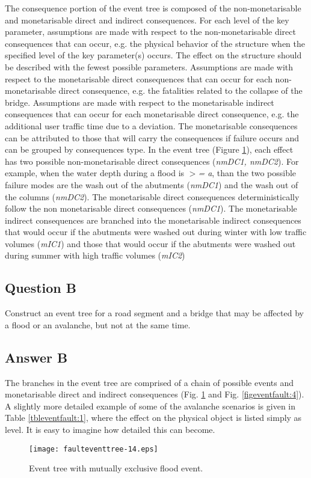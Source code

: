 The consequence portion of the event tree is composed of the non-monetarisable
and monetarisable direct and indirect consequences. For each level of the key
parameter, assumptions are made with respect to the non-monetarisable direct
consequences that can occur, e.g. the physical behavior of the structure when the
specified level of the key parameter(s) occurs. The effect on the structure
should be described with the fewest possible parameters. Assumptions are made
with respect to the monetarisable direct consequences that can occur for each
non-monetarisable direct consequence, e.g. the fatalities related to the collapse
of the bridge. Assumptions are made with respect to the monetarisable indirect
consequences that can occur for each monetarisable direct consequence, e.g. the
additional user traffic time due to a deviation. The monetarisable consequences
can be attributed to those that will carry the consequences if failure occurs and
can be grouped by consequences type.
In the event tree (Figure \ref{figeventfault:3}), each effect has two possible
non-monetarisable direct consequences (\textit{nmDC{\tiny 1}, nmDC{\tiny 2}}).
For example, when the water depth during a flood is \textit{$>$= a}, than the two
possible failure modes are the wash out of the abutments (\textit{nmDC{\tiny 1}})
and the wash out of the columns (\textit{nmDC{\tiny 2}}). The monetarisable
direct consequences deterministically follow the non monetarisable direct
consequences (\textit{nmDC{\tiny 1}}). The monetarisable indirect consequences
are branched into the monetarisable indirect consequences that would occur if the
abutments were washed out during winter with low traffic volumes
(\textit{mIC{\tiny 1}}) and those that would occur if the abutments were washed
out during summer with high traffic volumes (\textit{mIC{\tiny 2}})
\subsection{Question B}
Construct an event tree for a road segment and a bridge that may be affected by
a flood or an avalanche, but not at the same time.
\subsection{Answer B}
The branches in the event tree are comprised of a chain of possible events and
monetarisable direct and indirect consequences (Fig. \ref{figeventfault:3} and Fig. \ref{figeventfault:4}). A slightly more
detailed example of some of the avalanche scenarios is given in Table
\ref{tbleventfault:1}, where the effect on the physical object is listed simply as level.
It is easy to imagine how detailed this can become.
\begin{figure}[h]
\begin{center}
\texttt{[image: faulteventtree-14.eps]}
\caption{Event tree with mutually exclusive flood event.}\label{figeventfault:3}
\end{center}
\end{figure}

